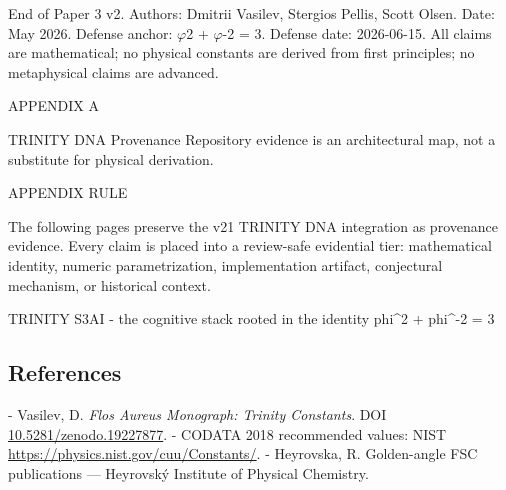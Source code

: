   End of Paper 3 v2. Authors: Dmitrii Vasilev, Stergios Pellis, Scott Olsen. Date: May
  2026. Defense anchor: $\varphi$2 + $\varphi$-2 = 3. Defense date: 2026-06-15. All claims are
  mathematical; no physical constants are derived from first principles; no metaphysical
  claims are advanced.

                                                        APPENDIX A

                      TRINITY DNA Provenance
     Repository evidence is an architectural map, not a substitute for physical derivation.

  APPENDIX RULE

  The following pages preserve the v21 TRINITY DNA integration as provenance evidence. Every claim is
  placed into a review-safe evidential tier: mathematical identity, numeric parametrization, implementation
  artifact, conjectural mechanism, or historical context.

                           TRINITY S3AI - the cognitive stack rooted in the identity phi\textasciicircum{}2 + phi\textasciicircum{}-2 = 3

\subsection{References}

- Vasilev, D. \textit{Flos Aureus Monograph: Trinity Constants}. DOI \href{https://zenodo.org/doi/10.5281/zenodo.19227877}{10.5281/zenodo.19227877}.
- CODATA 2018 recommended values: NIST \href{https://physics.nist.gov/cuu/Constants/}{https://physics.nist.gov/cuu/Constants/}.
- Heyrovska, R. Golden-angle FSC publications --- Heyrovský Institute of Physical Chemistry.
